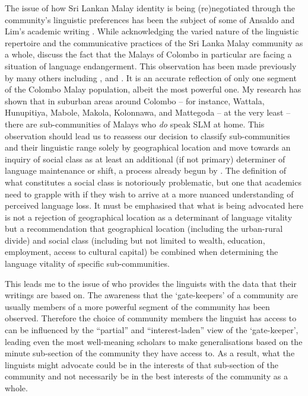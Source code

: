 The issue of how Sri Lankan Malay identity is being (re)negotiated through the community's linguistic preferences has been the subject of some of Ansaldo and Lim's academic writing \citep{Ansaldo2008genesis,AnsaldoEtAl2006,LimEtAl2007}. While acknowledging the varied nature of the linguistic repertoire and the communicative practices of the Sri Lanka Malay community as a whole, \citet{LimEtAl2007} discuss the fact that the Malays of Colombo in particular are facing a situation of language endangerment. This observation has been made previously by many others including \citet{Saldin2000,Saldin2001,Saldin2007}, \citet{Hussainmiya1987,Hussainmiya1990,Hussainmiya2008} and \citet{SmithEtAl2004}. It is an accurate reflection of only one segment of the Colombo Malay population, albeit the most powerful one. My research has shown that in suburban areas around Colombo -- for instance, Wattala, Hunupitiya, Mabole, Makola, Kolonnawa, and Mattegoda -- at the very least -- there are sub-communities of Malays who \textit{do} speak SLM at home. This observation should lead us to reassess our decision to classify sub-communities and their linguistic range solely by geographical location and move towards an inquiry of social class as at least an additional (if not primary) determiner of language maintenance or shift, a process already begun by \citet{Ansaldo2008genesis}. The definition of what constitutes a social class is notoriously problematic, but one that academics need to grapple with if they wish to arrive at a more nuanced understanding of perceived language loss. It must be emphasised that what is being advocated here is not a rejection of geographical location as a determinant  of language vitality but a recommendation that geographical location (including the urban-rural divide) and social class (including but not limited to wealth, education, employment, access to cultural capital) be combined when determining the language vitality of specific sub-communities. 

This leads me to the issue of who provides the linguists with the data that their writings are based on. The awareness that the `gate-keepers' of a community are usually members of a more powerful segment of the community has been observed. Therefore the choice of community members the linguist has access to can be influenced by the ``partial'' and ``interest-laden'' \citep{HillEtAl1992} view of the `gate-keeper', leading even the most well-meaning scholars to make generalisations based on the minute sub-section of the community they have access to. As a result, what the linguists might advocate could be in the interests of that sub-section of the community and not necessarily be in the best interests of the community as a whole. 


